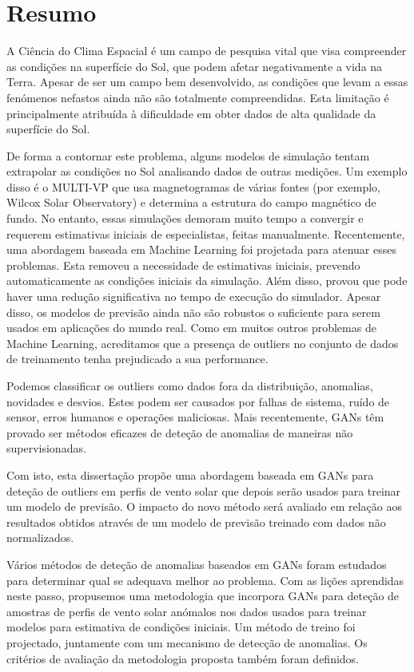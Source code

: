 \chapter*{Resumo}

A Ciência do Clima Espacial é um campo de pesquisa vital que visa compreender as condições na superfície do Sol, que podem afetar negativamente a vida na Terra. Apesar de ser um campo bem desenvolvido, as condições que levam a essas fenómenos nefastos ainda não são totalmente compreendidas. Esta limitação é principalmente atribuída à dificuldade em obter dados de alta qualidade da superfície do Sol.

De forma a contornar este problema, alguns modelos de simulação tentam extrapolar as condições no Sol analisando dados de outras medições. Um exemplo disso é o MULTI-VP que usa magnetogramas de várias fontes (por exemplo, Wilcox Solar Observatory) e determina a estrutura do campo magnético de fundo. No entanto, essas simulações demoram muito tempo a convergir e requerem estimativas iniciais de especialistas, feitas manualmente. Recentemente, uma abordagem baseada em Machine Learning foi projetada para atenuar esses problemas. Esta removeu a necessidade de estimativas iniciais, prevendo automaticamente as condições iniciais da simulação. Além disso, provou que pode haver uma redução significativa no tempo de execução do simulador. Apesar disso, os modelos de previsão ainda não são robustos o suficiente para serem usados em aplicações do mundo real. Como em muitos outros problemas de Machine Learning, acreditamos que a presença de outliers no conjunto de dados de treinamento tenha prejudicado a sua performance.

Podemos classificar os outliers como dados fora da distribuição, anomalias, novidades e desvios. Estes podem ser causados por falhas de sistema, ruído de sensor, erros humanos e operações maliciosas. Mais recentemente, GANs têm provado ser métodos eficazes de deteção de anomalias de maneiras não supervisionadas.

Com isto, esta dissertação propõe uma abordagem baseada em GANs para deteção de outliers em perfis de vento solar que depois serão usados para treinar um modelo de previsão. O impacto do novo método será avaliado em relação aos resultados obtidos através de um modelo de previsão treinado com dados não normalizados.

Vários métodos de deteção de anomalias baseados em GANs foram estudados para determinar qual se adequava melhor ao problema. Com as lições aprendidas neste passo, propusemos uma metodologia que incorpora GANs para deteção de amostras de perfis de vento solar anómalos nos dados usados para treinar modelos para estimativa de condições iniciais. Um método de treino foi projectado, juntamente com um mecanismo de detecção de anomalias. Os critérios de avaliação da metodologia proposta também foram definidos.


